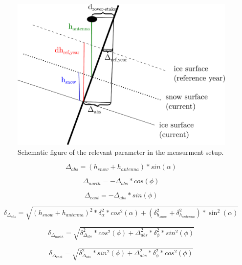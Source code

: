 \begin{figure}
\centering
\includegraphics[width=\linewidth]{./figs/pictures/schematic_setup.pdf}
\caption{Schematic figure of the relevant parameter in the measurment setup.}
\end{figure}

\begin{equation}
	\Delta_{abs} = (h_{snow} + h_{antenna}) * sin(\alpha)
\end{equation}

\begin{equation}
	\Delta_{north} = - \Delta_{abs} * cos(\phi)
\end{equation}

\begin{equation}
	\Delta_{east} = - \Delta_{abs} * sin(\phi)
\end{equation}


\begin{equation}
	\delta_{\Delta_{abs}} = \sqrt{(h_{snow} + h_{antenna})^2 * \delta_{\alpha}^2 * cos^2(\alpha) + (\delta_{h_{snow}}^2 + \delta_{h_{antenna}}^2) * \sin^2(\alpha)}
\end{equation}

\begin{equation}
	\delta_{\Delta_{north}} = \sqrt{\delta_{\Delta_{abs}}^2 * cos^2(\phi) + \Delta_{abs}^2 * \delta_{\phi}^2 * sin^2(\phi)}
\end{equation}

\begin{equation}
	\delta_{\Delta_{east}} = \sqrt{\delta_{\Delta_{abs}}^2 * sin^2(\phi) + \Delta_{abs}^2 * \delta_{\phi}^2 * cos^2(\phi)}
\end{equation}

